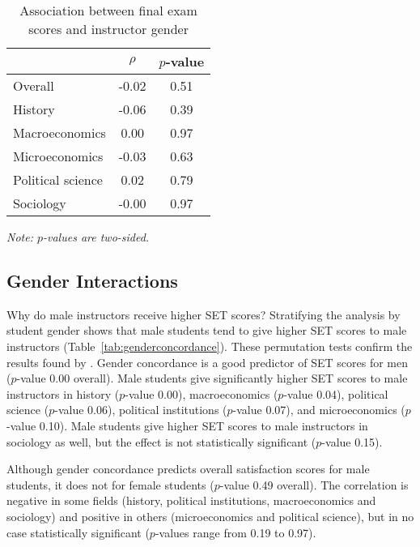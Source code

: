 \documentclass[12pt]{article}
\begin{document}
\begin{table}[htbp]
  \centering
  \footnotesize 
  \caption{Association between final exam scores and instructor gender}
    \begin{tabular}{lcc}
    \toprule 
                     & $\rho$  & $p$-value    \\
   \midrule
    Overall &            -0.02       & 0.51      \\
    History &            -0.06       & 0.39      \\
    Macroeconomics &      0.00       & 0.97      \\
    Microeconomics &     -0.03       & 0.63      \\
    Political science &  0.02       & 0.79      \\
    Sociology &          -0.00       & 0.97      \\
    \bottomrule
    \end{tabular}%
 \label{tab:genderfinal}%
 
  \textit{Note: $p$-values are two-sided.}
\end{table}%
\normalsize


\subsection{Gender Interactions}
Why do male instructors receive higher SET scores? 
Stratifying the analysis by student gender shows that
male students tend to give higher SET scores to male instructors (Table~\ref{tab:genderconcordance}). 
These permutation tests confirm the results found by \citet{Boring2015}. 
Gender concordance is a good predictor of SET scores for men ($p$-value 0.00 overall). 
Male students give significantly higher SET scores to male instructors in  
history ($p$-value 0.00), macroeconomics ($p$-value 0.04), political science ($p$-value 0.06), political institutions ($p$-value 0.07), and microeconomics ($p$-value 0.10). 
Male students give higher SET scores to male instructors in sociology as well, but the
effect is not statistically significant ($p$-value 0.15). 

Although gender concordance predicts overall satisfaction scores for male students, 
it does not for female students ($p$-value 0.49 overall). 
The correlation is negative in some fields (history, political institutions, macroeconomics and sociology) and positive in others (microeconomics and political science), but in no case statistically significant ($p$-values range from 0.19 to 0.97).
\end{document}
